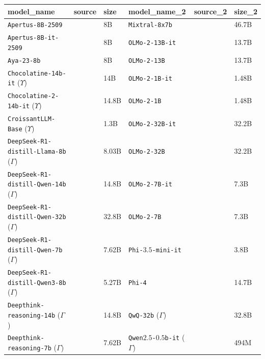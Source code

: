 \begin{tabular}{llllll}
\toprule
model_name & source & size & model_name_2 & source_2 & size_2 \\
\midrule
\texttt{Apertus-8B-2509} & \citet{swissai2025apertus} & 8B & \texttt{Mixtral-8x7b} & \citet{rastogi2025magistral} & 46.7B \\
\texttt{Apertus-8B-it-2509} & \citet{swissai2025apertus} & 8B & \texttt{OLMo-2-13B-it} & \citet{olmo20242olmo2furious} & 13.7B \\
\texttt{Aya-23-8b} & \citet{aryabumi2024aya} & 8B & \texttt{OLMo-2-13B} & \citet{olmo20242olmo2furious} & 13.7B \\
\texttt{Chocolatine-14b-it} ($\Upsilon$) & \citet{chocolatine} & 14B & \texttt{OLMo-2-1B-it} & \citet{olmo20242olmo2furious} & 1.48B \\
\texttt{Chocolatine-2-14b-it} ($\Upsilon$) & \citet{chocolatinev2} & 14.8B & \texttt{OLMo-2-1B} & \citet{olmo20242olmo2furious} & 1.48B \\
\texttt{CroissantLLM-Base} ($\Upsilon$) & \citet{faysse2024croissantllm} & 1.3B & \texttt{OLMo-2-32B-it} & \citet{olmo20242olmo2furious} & 32.2B \\
\texttt{DeepSeek-R1-distill-Llama-8b} ($\Gamma$) & \citet{deepseekai2025deepseekr1incentivizingreasoningcapability} & 8.03B & \texttt{OLMo-2-32B} & \citet{olmo20242olmo2furious} & 32.2B \\
\texttt{DeepSeek-R1-distill-Qwen-14b} ($\Gamma$) & \citet{deepseekai2025deepseekr1incentivizingreasoningcapability} & 14.8B & \texttt{OLMo-2-7B-it} & \citet{olmo20242olmo2furious} & 7.3B \\
\texttt{DeepSeek-R1-distill-Qwen-32b} ($\Gamma$) & \citet{deepseekai2025deepseekr1incentivizingreasoningcapability} & 32.8B & \texttt{OLMo-2-7B} & \citet{olmo20242olmo2furious} & 7.3B \\
\texttt{DeepSeek-R1-distill-Qwen-7b} ($\Gamma$) & \citet{deepseekai2025deepseekr1incentivizingreasoningcapability} & 7.62B & \texttt{Phi-$3.5$-mini-it} & \citet{abdin2024phi3technicalreporthighly} & 3.8B \\
\texttt{DeepSeek-R1-distill-Qwen3-8b} ($\Gamma$) & \citet{deepseekai2025deepseekr1incentivizingreasoningcapability} & 5.27B & \texttt{Phi-4} & \citet{abdin2024phi} & 14.7B \\
\texttt{Deepthink-reasoning-14b} ($\Gamma$) & \citet{deepthink2} & 14.8B & \texttt{QwQ-32b} ($\Gamma$) & \citet{qwq32b} & 32.8B \\
\texttt{Deepthink-reasoning-7b} ($\Gamma$) & \citet{deepthink1} & 7.62B & \texttt{Qwen$2.5$-$0.5$b-it} ($\Gamma$) & \citet{hui2024qwen2} & 494M \\

\end{tabular}
